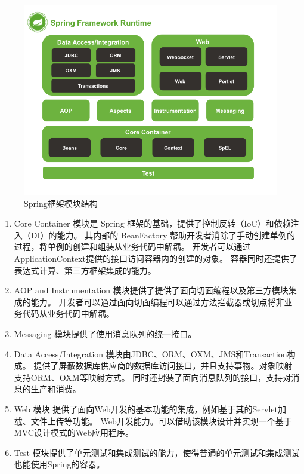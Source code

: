 \begin{figure}[ht]
    \centering
    \includegraphics[scale=.6]{./Figure/IMG_spring.png}
    \caption{Spring框架模块结构}
    \label{Fig:spring}
\end{figure}

\begin{enumerate}
    \item Core Container 模块是 Spring 框架的基础，提供了控制反转（IoC）和依赖注入（DI）的能力。
    其内部的 BeanFactory 帮助开发者消除了手动创建单例的过程，将单例的创建和组装从业务代码中解耦。
    开发者可以通过ApplicationContext提供的接口访问容器内的创建的对象。
    容器同时还提供了表达式计算、第三方框架集成的能力。
    \item AOP and Instrumentation 模块提供了提供了面向切面编程以及第三方模块集成的能力。
    开发者可以通过面向切面编程可以通过方法拦截器或切点将非业务代码从业务代码中解耦。
    \item Messaging 模块提供了使用消息队列的统一接口。
    \item Data Access/Integration 模块由JDBC、ORM、OXM、JMS和Transaction构成。
    提供了屏蔽数据库供应商的数据库访问接口，并且支持事物。对象映射支持ORM、OXM等映射方式。
    同时还封装了面向消息队列的接口，支持对消息的生产和消费。
    \item Web 模块 提供了面向Web开发的基本功能的集成，例如基于其的Servlet加载、文件上传等功能。
    Web开发能力。可以借助该模块设计并实现一个基于MVC设计模式的Web应用程序。
    \item Test 模块提供了单元测试和集成测试的能力，使得普通的单元测试和集成测试也能使用Spring的容器。
\end{enumerate}

